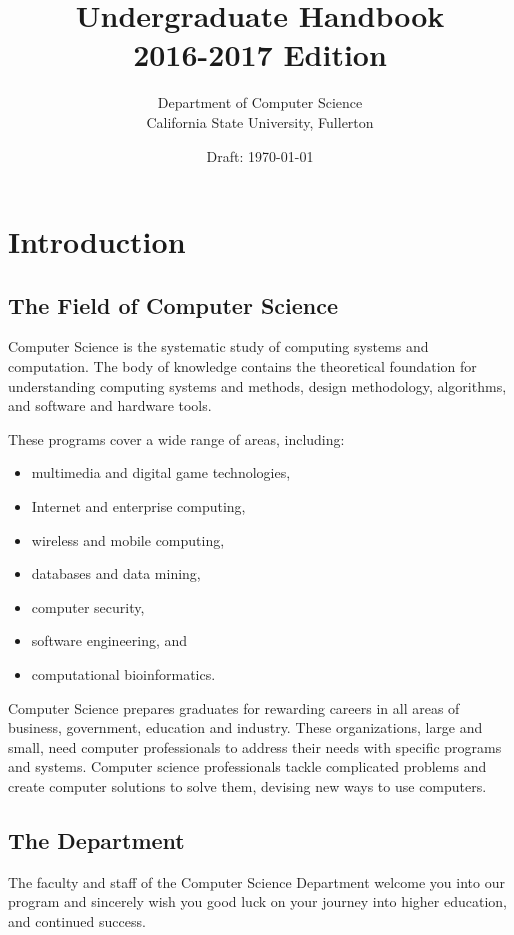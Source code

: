 \documentclass{book}
\begin{document}
\title{Undergraduate Handbook \\ 2016-2017 Edition}
\author{Department of Computer Science \\ California State University, Fullerton}
\date{Draft: \today}
\maketitle

\newpage
\tableofcontents

\chapter{Introduction}

\section{The Field of Computer Science}
Computer Science is the systematic study of computing systems and computation. The body of knowledge contains the theoretical foundation for understanding computing systems and methods, design methodology, algorithms, and software and hardware tools.

These programs cover a wide range of areas, including:
\begin{itemize}
\item multimedia and digital game technologies,
\item Internet and enterprise computing,
\item wireless and mobile computing,
\item databases and data mining,
\item computer security,
\item software engineering, and
\item computational bioinformatics.
\end{itemize}

Computer Science prepares graduates for rewarding careers in all areas of business, government, education and industry. These organizations, large and small, need computer professionals to address their needs with specific programs and systems. Computer science professionals tackle complicated problems and create computer solutions to solve them, devising new ways to use computers.

\section{The Department}
\label{section:the_department}
The faculty and staff of the Computer Science Department welcome you into our program and sincerely wish you good luck on your journey into higher education, and continued success.
\end{document}
